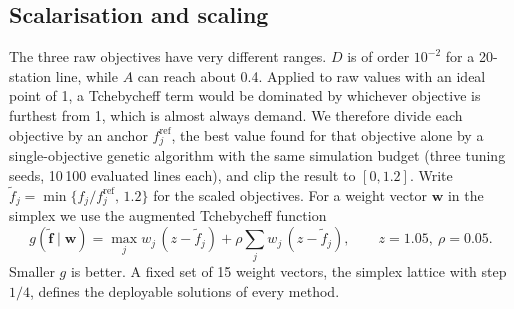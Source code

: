 \subsection{Scalarisation and scaling}\label{sec:scalar}
The three raw objectives have very different ranges. $D$ is of order $10^{-2}$ for a 20-station line, while $A$ can reach about 0.4. Applied to raw values with an ideal point of 1, a Tchebycheff term would be dominated by whichever objective is furthest from 1, which is almost always demand. We therefore divide each objective by an anchor $f^{\mathrm{ref}}_j$, the best value found for that objective alone by a single-objective genetic algorithm with the same simulation budget (three tuning seeds, 10\,100 evaluated lines each), and clip the result to $[0,1.2]$. Write $\tilde f_j=\min\{f_j/f^{\mathrm{ref}}_j,\,1.2\}$ for the scaled objectives. For a weight vector $\mathbf{w}$ in the simplex we use the augmented Tchebycheff function
\begin{equation}
g(\tilde{\mathbf f}\mid\mathbf w)=\max_j w_j\,(z-\tilde f_j)+\rho\sum_j w_j\,(z-\tilde f_j),\qquad z=1.05,\ \rho=0.05 .\label{eq:tcheb}
\end{equation}
Smaller $g$ is better. A fixed set of 15 weight vectors, the simplex lattice with step $1/4$, defines the deployable solutions of every method.
